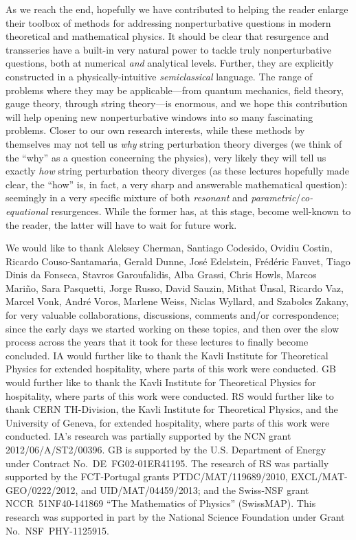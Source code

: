 \documentclass[11pt,a4paper]{article}
\begin{document}
As we reach the end, hopefully we have contributed to helping the reader enlarge their toolbox of methods for addressing nonperturbative questions in modern theoretical and mathematical physics. It should be clear that resurgence and transseries have a built-in very natural power to tackle truly nonperturbative questions, both at numerical \textit{and} analytical levels. Further, they are explicitly constructed in a physically-intuitive \textit{semiclassical} language. The range of problems where they may be applicable---from quantum mechanics, field theory, gauge theory, through string theory---is enormous, and we hope this contribution will help opening new nonperturbative windows into so many fascinating problems. Closer to our own research interests, while these methods by themselves may not tell us \textit{why} string perturbation theory diverges (we think of the ``why'' as a question concerning the physics), very likely they will tell us exactly \textit{how} string perturbation theory diverges (as these lectures hopefully made clear, the ``how'' is, in fact, a very sharp and answerable mathematical question): seemingly in a very specific mixture of both \textit{resonant} and \textit{parametric}/\textit{co-equational} resurgences. While the former has, at this stage, become well-known to the reader, the latter will have to wait for future work.

\acknowledgments
We would like to thank Aleksey Cherman, Santiago Codesido, Ovidiu Costin, Ricardo Couso-Santamar\'\i a, Gerald Dunne, Jos\'e Edelstein, Fr\'ed\'eric Fauvet, Tiago Dinis da Fonseca, Stavros Garoufalidis, Alba Grassi, Chris Howls, Marcos Mari\~no, Sara Pasquetti, Jorge Russo, David Sauzin, Mithat \"Unsal, Ricardo Vaz, Marcel Vonk, Andr\'e Voros, Marlene Weiss, Niclas Wyllard, and Szabolcs Zakany, for very valuable collaborations, discussions, comments and/or correspondence; since the early days we started working on these topics, and then over the slow process across the years that it took for these lectures to finally become concluded. IA would further like to thank the Kavli Institute for Theoretical Physics for extended hospitality, where parts of this work were conducted. GB would further like to thank the Kavli Institute for Theoretical Physics for hospitality, where parts of this work were conducted. RS would further like to thank CERN TH-Division, the Kavli Institute for Theoretical Physics, and the University of Geneva, for extended hospitality, where parts of this work were conducted. IA's research was partially supported by the NCN grant 2012/06/A/ST2/00396. GB is supported by the U.S. Department of Energy under Contract No.~DE~FG02-01ER41195. The research of RS was partially supported by the FCT-Portugal grants PTDC/MAT/119689/2010, EXCL/MAT-GEO/0222/2012, and UID/MAT/04459/2013; and the Swiss-NSF grant NCCR~51NF40-141869 ``The Mathematics of Physics'' (SwissMAP). This research was supported in part by the National Science Foundation under Grant No.~NSF~PHY-1125915.
\end{document}
